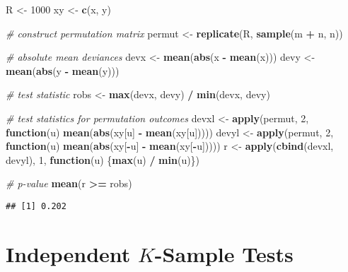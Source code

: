 \documentclass[
]{book}
\newenvironment{Shaded}{\begin{snugshade}}{\end{snugshade}}
\newcommand{\CommentTok}[1]{\textcolor[rgb]{0.56,0.35,0.01}{\textit{#1}}}
\newcommand{\ControlFlowTok}[1]{\textcolor[rgb]{0.13,0.29,0.53}{\textbf{#1}}}
\newcommand{\DecValTok}[1]{\textcolor[rgb]{0.00,0.00,0.81}{#1}}
\newcommand{\KeywordTok}[1]{\textcolor[rgb]{0.13,0.29,0.53}{\textbf{#1}}}
\newcommand{\NormalTok}[1]{#1}
\newcommand{\OperatorTok}[1]{\textcolor[rgb]{0.81,0.36,0.00}{\textbf{#1}}}
\newcommand{\StringTok}[1]{\textcolor[rgb]{0.31,0.60,0.02}{#1}}
\begin{document}
\begin{Shaded}
\begin{Highlighting}[]
\NormalTok{R <-}\StringTok{ }\DecValTok{1000}
\NormalTok{xy <-}\StringTok{ }\KeywordTok{c}\NormalTok{(x, y)}

\CommentTok{# construct permutation matrix}
\NormalTok{permut <-}\StringTok{ }\KeywordTok{replicate}\NormalTok{(R, }\KeywordTok{sample}\NormalTok{(m }\OperatorTok{+}\StringTok{ }\NormalTok{n, n))}

\CommentTok{# absolute mean deviances}
\NormalTok{devx <-}\StringTok{ }\KeywordTok{mean}\NormalTok{(}\KeywordTok{abs}\NormalTok{(x }\OperatorTok{-}\StringTok{ }\KeywordTok{mean}\NormalTok{(x)))}
\NormalTok{devy <-}\StringTok{ }\KeywordTok{mean}\NormalTok{(}\KeywordTok{abs}\NormalTok{(y }\OperatorTok{-}\StringTok{ }\KeywordTok{mean}\NormalTok{(y)))}

\CommentTok{# test statistic}
\NormalTok{robs <-}\StringTok{ }\KeywordTok{max}\NormalTok{(devx, devy) }\OperatorTok{/}\StringTok{ }\KeywordTok{min}\NormalTok{(devx, devy)}

\CommentTok{# test statistics for permutation outcomes}
\NormalTok{devxl <-}\StringTok{ }\KeywordTok{apply}\NormalTok{(permut, }\DecValTok{2}\NormalTok{,}
               \ControlFlowTok{function}\NormalTok{(u) }\KeywordTok{mean}\NormalTok{(}\KeywordTok{abs}\NormalTok{(xy[u] }\OperatorTok{-}\StringTok{ }\KeywordTok{mean}\NormalTok{(xy[u]))))}
\NormalTok{devyl <-}\StringTok{ }\KeywordTok{apply}\NormalTok{(permut, }\DecValTok{2}\NormalTok{,}
               \ControlFlowTok{function}\NormalTok{(u) }\KeywordTok{mean}\NormalTok{(}\KeywordTok{abs}\NormalTok{(xy[}\OperatorTok{-}\NormalTok{u] }\OperatorTok{-}\StringTok{ }\KeywordTok{mean}\NormalTok{(xy[}\OperatorTok{-}\NormalTok{u]))))}
\NormalTok{r <-}\StringTok{ }\KeywordTok{apply}\NormalTok{(}\KeywordTok{cbind}\NormalTok{(devxl, devyl), }\DecValTok{1}\NormalTok{,}
            \ControlFlowTok{function}\NormalTok{(u) \{}\KeywordTok{max}\NormalTok{(u) }\OperatorTok{/}\StringTok{ }\KeywordTok{min}\NormalTok{(u)\})}

\CommentTok{# p-value}
\KeywordTok{mean}\NormalTok{(r }\OperatorTok{>=}\StringTok{ }\NormalTok{robs)}
\end{Highlighting}
\end{Shaded}

\begin{verbatim}
## [1] 0.202
\end{verbatim}

\hypertarget{independent-k-sample-tests}{%
\chapter{\texorpdfstring{Independent \(K\)-Sample Tests}{Independent K-Sample Tests}}\label{independent-k-sample-tests}}
\end{document}
